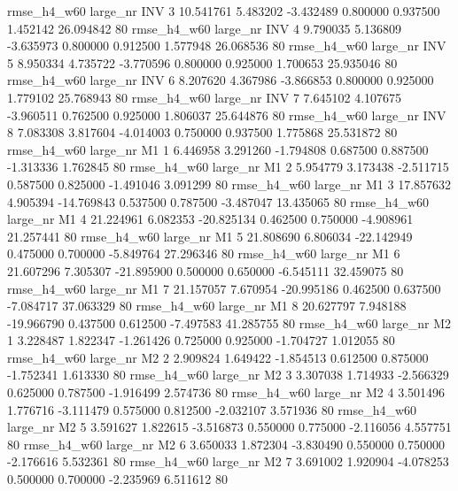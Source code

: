  rmse_h4_w60   large_nr      INV                 3 10.541761  5.483202  -3.432489 0.800000 0.937500  1.452142   26.094842 80
 rmse_h4_w60   large_nr      INV                 4  9.790035  5.136809  -3.635973 0.800000 0.912500  1.577948   26.068536 80
 rmse_h4_w60   large_nr      INV                 5  8.950334  4.735722  -3.770596 0.800000 0.925000  1.700653   25.935046 80
 rmse_h4_w60   large_nr      INV                 6  8.207620  4.367986  -3.866853 0.800000 0.925000  1.779102   25.768943 80
 rmse_h4_w60   large_nr      INV                 7  7.645102  4.107675  -3.960511 0.762500 0.925000  1.806037   25.644876 80
 rmse_h4_w60   large_nr      INV                 8  7.083308  3.817604  -4.014003 0.750000 0.937500  1.775868   25.531872 80
 rmse_h4_w60   large_nr       M1                 1  6.446958  3.291260  -1.794808 0.687500 0.887500 -1.313336    1.762845 80
 rmse_h4_w60   large_nr       M1                 2  5.954779  3.173438  -2.511715 0.587500 0.825000 -1.491046    3.091299 80
 rmse_h4_w60   large_nr       M1                 3 17.857632  4.905394 -14.769843 0.537500 0.787500 -3.487047   13.435065 80
 rmse_h4_w60   large_nr       M1                 4 21.224961  6.082353 -20.825134 0.462500 0.750000 -4.908961   21.257441 80
 rmse_h4_w60   large_nr       M1                 5 21.808690  6.806034 -22.142949 0.475000 0.700000 -5.849764   27.296346 80
 rmse_h4_w60   large_nr       M1                 6 21.607296  7.305307 -21.895900 0.500000 0.650000 -6.545111   32.459075 80
 rmse_h4_w60   large_nr       M1                 7 21.157057  7.670954 -20.995186 0.462500 0.637500 -7.084717   37.063329 80
 rmse_h4_w60   large_nr       M1                 8 20.627797  7.948188 -19.966790 0.437500 0.612500 -7.497583   41.285755 80
 rmse_h4_w60   large_nr       M2                 1  3.228487  1.822347  -1.261426 0.725000 0.925000 -1.704727    1.012055 80
 rmse_h4_w60   large_nr       M2                 2  2.909824  1.649422  -1.854513 0.612500 0.875000 -1.752341    1.613330 80
 rmse_h4_w60   large_nr       M2                 3  3.307038  1.714933  -2.566329 0.625000 0.787500 -1.916499    2.574736 80
 rmse_h4_w60   large_nr       M2                 4  3.501496  1.776716  -3.111479 0.575000 0.812500 -2.032107    3.571936 80
 rmse_h4_w60   large_nr       M2                 5  3.591627  1.822615  -3.516873 0.550000 0.775000 -2.116056    4.557751 80
 rmse_h4_w60   large_nr       M2                 6  3.650033  1.872304  -3.830490 0.550000 0.750000 -2.176616    5.532361 80
 rmse_h4_w60   large_nr       M2                 7  3.691002  1.920904  -4.078253 0.500000 0.700000 -2.235969    6.511612 80
